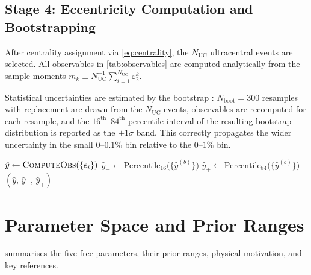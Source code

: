 \documentclass[12pt,a4paper,twoside]{report}
\begin{document}
\subsection{Stage 4: Eccentricity Computation and Bootstrapping}
\label{subsec:stage4}

After centrality assignment via \cref{eq:centrality}, the
$N_\mathrm{UC}$ ultracentral events are selected.  All observables
in \cref{tab:observables} are computed analytically from the sample
moments $m_k \equiv N_\mathrm{UC}^{-1}\sum_{i=1}^{N_\mathrm{UC}}
\varepsilon_2^k$.

Statistical uncertainties are estimated by the bootstrap
\cite{Efron1979}: $N_\mathrm{boot} = 300$ resamples with replacement
are drawn from the $N_\mathrm{UC}$ events, observables are recomputed
for each resample, and the $16^\mathrm{th}$--$84^\mathrm{th}$
percentile interval of the resulting bootstrap distribution is
reported as the $\pm 1\sigma$ band.  This correctly propagates
the wider uncertainty in the small $0$--$0.1\%$ bin relative to the
$0$--$1\%$ bin.

\begin{algorithm}[H]
\caption{Bootstrap Uncertainty Estimation for Ultracentral Observables}
\label{alg:bootstrap}
\SetAlgoLined
{}
$\hat{y} \leftarrow \textsc{ComputeObs}(\{e_i\})$\;
$\hat{y}_- \leftarrow \mathrm{Percentile}_{16}\bigl(\{\hat{y}^{(b)}\}\bigr)$\;
$\hat{y}_+ \leftarrow \mathrm{Percentile}_{84}\bigl(\{\hat{y}^{(b)}\}\bigr)$\;
\Return $(\hat{y},\, \hat{y}_-,\, \hat{y}_+)$
\end{algorithm}

\section{Parameter Space and Prior Ranges}
\label{sec:priors}

 summarises the five free parameters, their
prior ranges, physical motivation, and key references.
\end{document}
